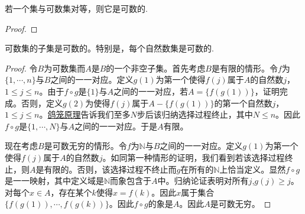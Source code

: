 \documentclass[lang=cn,newtx,10pt,scheme=chinese]{../Template/elegantbook}
\begin{document}
\begin{proposition}\label{proposition:与可数集对等的集合是可数集}
  若一个集与可数集对等，则它是可数的.
\end{proposition}
\begin{proof}
  
\end{proof}

\begin{theorem}\label{theorem:可数集的子集是可数的}
  可数集的子集是可数的。特别是，每个自然数集是可数的.
\end{theorem}
\begin{proof}
  令\(B\)为可数集而\(A\)是\(B\)的一个非空子集。首先考虑\(B\)是有限的情形。令\(f\)为\(\{1, \cdots, n\}\)与\(B\)之间的一一对应。定义\(g(1)\)为第一个使得\(f(j)\)属于\(A\)的自然数\(j\)，\(1\leqslant j\leqslant n\)。由于\(f\circ g\)是\(\{1\}\)与\(A\)之间的一一对应，若\(A = \{f(g(1))\}\)，证明完成。否则，定义\(g(2)\)为使得\(f(j)\)属于\(A-\{f(g(1))\}\)的第一个自然数\(j\)，\(1\leqslant j\leqslant n\)。\hyperref[theorem:鸽笼原理]{鸽笼原理}告诉我们至多\(N\)步后该归纳选择过程终止，其中\(N\leqslant n\)。因此\(f\circ g\)是\(\{1, \cdots, N\}\)与\(A\)之间的一一对应。于是\(A\)有限。

现在考虑\(B\)是可数无穷的情形。令\(f\)为\(\mathbb{N}\)与\(B\)之间的一一对应。定义\(g(1)\)为第一个使得\(f(j)\)属于\(A\)的自然数\(j\)。如同第一种情形的证明，我们看到若该选择过程终止，则\(A\)是有限的。否则，该选择过程不终止而\(g\)在所有的\(\mathbb{N}\)上恰当定义。显然\(f\circ g\)是一一映射，其中定义域是\(\mathbb{N}\)而象包含于\(A\)中。归纳论证表明对所有\(j\),\(g(j)\geqslant j\)。对每个\(x\in A\)，存在某个\(k\)使得\(x = f(k)\)。因此\(x\)属于集合\(\{f(g(1)), \cdots, f(g(k))\}\)。因此\(f\circ g\)的象是\(A\)。因此\(A\)是可数无穷。
\end{proof}
\end{document}
